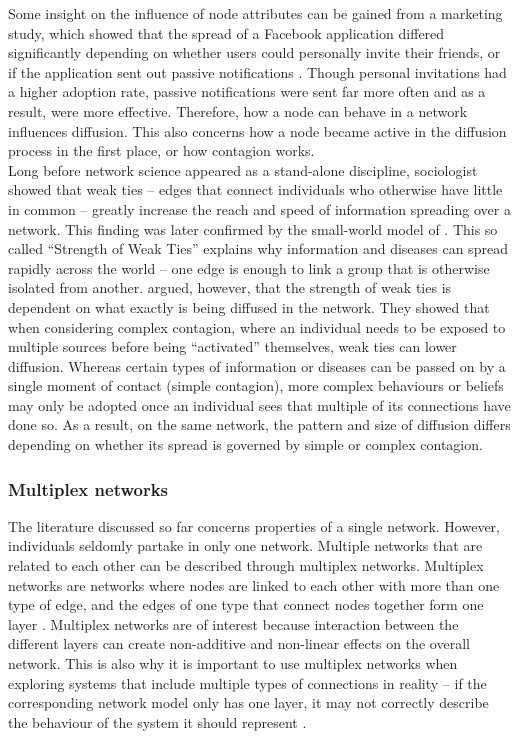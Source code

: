 Some insight on the influence of node attributes can be gained from a marketing study, which showed that the spread of a Facebook application differed significantly depending on whether users could personally invite their friends, or if the application sent out passive notifications \cite{Aral2011}. Though personal invitations had a higher adoption rate, passive notifications were sent far more often and as a result, were more effective. Therefore, how a node can behave in a network influences diffusion. This also concerns how a node became active in the diffusion process in the first place, or how contagion works. \\

Long before network science appeared as a stand-alone discipline, sociologist \cite{Granovetter1977} showed that weak ties – edges that connect individuals who otherwise have little in common – greatly increase the reach and speed of information spreading over a network. This finding was later confirmed by the small-world model of \cite{Watts1998}. This so called “Strength of Weak Ties” explains why information and diseases can spread rapidly across the world – one edge is enough to link a group that is otherwise isolated from another. \cite{Centola2007} argued, however, that the strength of weak ties is dependent on what exactly is being diffused in the network. They showed that when considering complex contagion, where an individual needs to be exposed to multiple sources before being “activated” themselves, weak ties can lower diffusion. Whereas certain types of information or diseases can be passed on by a single moment of contact (simple contagion), more complex behaviours or beliefs may only be adopted once an individual sees that multiple of its connections have done so. As a result, on the same network, the pattern and size of diffusion differs depending on whether its spread is governed by simple or complex contagion.

\subsubsection{Multiplex networks}
The literature discussed so far concerns properties of a single network. However, individuals seldomly partake in only one network. Multiple networks that are related to each other can be described through multiplex networks. Multiplex networks are networks where nodes are linked to each other with more than one type of edge, and the edges of one type that connect nodes together form one layer \citep{Lee2015}. Multiplex networks are of interest because interaction between the different layers can create non-additive and non-linear effects on the overall network. This is also why it is important to use multiplex networks when exploring systems that include multiple types of connections in reality – if the corresponding network model only has one layer, it may not correctly describe the behaviour of the system it should represent \citep{Lee2015}. \\


